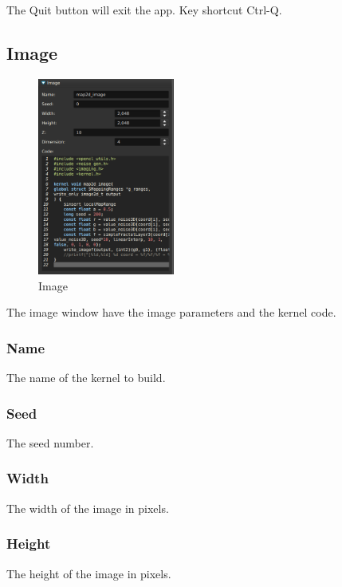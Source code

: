 The Quit button will exit the app. Key shortcut Ctrl-Q.

\label{sec:image}\subsection{Image}

\begin{figure}[h]
\centering
\includegraphics[width=0.4\textwidth]{imgs/main-image-0.png}
\caption{Image}\label{fig:main-image-0}
\end{figure}

The image window have the image parameters and the kernel code.

\subsubsection{Name}

The name of the kernel to build.

\subsubsection{Seed}

The seed number.

\subsubsection{Width}

The width of the image in pixels.

\subsubsection{Height}

The height of the image in pixels.

